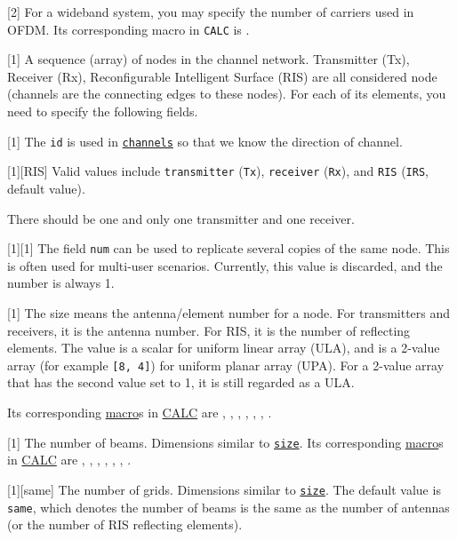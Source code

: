 [2]
For a wideband system,
you may specify the number of carriers used in OFDM.
Its corresponding
macro %
in
\texttt{CALC} %
is .

[1]
A sequence (array) of nodes in the channel network.
Transmitter (Tx), Receiver (Rx), Reconfigurable Intelligent Surface (RIS)
are all considered node (channels are the connecting edges to these nodes).
For each of its elements, you need to specify the following fields.

[1]
The \texttt{id} is used in \hyperref[d:subsec:sim_config_channels]{\texttt{channels}} so that we know the direction of channel.

[1][RIS]
Valid values include
\texttt{transmitter} (\texttt{Tx}),
\texttt{receiver} (\texttt{Rx}),
and \texttt{RIS} (\texttt{IRS}, default value).

There should be one and only one transmitter and one receiver.

[1][1]
The field \texttt{num} can be used to replicate several copies of the same node.
This is often used for multi-user scenarios.
Currently, this value is discarded, and the number is always 1.

[1]
The size means the antenna/element number for a node.
For transmitters and receivers, it is the antenna number.
For RIS, it is the number of reflecting elements.
The value is a scalar for uniform linear array (ULA),
and is a 2-value array (for example \texttt{[8, 4]}) for uniform planar array (UPA).
For a 2-value array that has the second value set to 1,
it is still regarded as a ULA.

Its corresponding \hyperref[d:sec:macro]{macro}s in \hyperref[d:sec:calc]{CALC} are
, , ,
, , , .

[1]
The number of beams.
Dimensions similar to \hyperref[d:subsubsec:sim_config_nodes_size]{\texttt{size}}.
Its corresponding \hyperref[d:sec:macro]{macro}s in \hyperref[d:sec:calc]{CALC} are
, , ,
, , , .

[1][same]
The number of grids.
Dimensions similar to \hyperref[d:subsubsec:sim_config_nodes_size]{\texttt{size}}.
The default value is \texttt{same}, which denotes the number of beams is the same as the number of antennas
(or the number of RIS reflecting elements).


